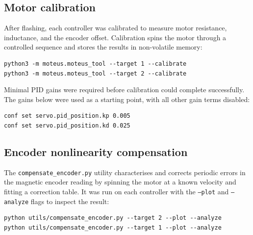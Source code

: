 \subsection{Motor calibration}

After flashing, each controller was calibrated to measure motor resistance, inductance,
and the encoder offset.
Calibration spins the motor through a controlled sequence and stores the results in
non-volatile memory:

\begin{listing}[H]
	\begin{verbatim}
python3 -m moteus.moteus_tool --target 1 --calibrate
python3 -m moteus.moteus_tool --target 2 --calibrate
\end{verbatim}
	\caption{Running the built-in calibration routine on both controllers.}
	\label{lst:moteus-calibrate}
\end{listing}

\noindent
Minimal PID gains were required before calibration could complete successfully.
The gains below were used as a starting point, with all other gain terms disabled:

\begin{listing}[H]
	\begin{verbatim}
conf set servo.pid_position.kp 0.005
conf set servo.pid_position.kd 0.025
\end{verbatim}
	\caption{Minimal PID gains set in tview prior to calibration.}
	\label{lst:moteus-init-pid}
\end{listing}

\subsection{Encoder nonlinearity compensation}

The \texttt{compensate\_encoder.py} utility characterises and corrects periodic errors in the
magnetic encoder reading by spinning the motor at a known velocity and fitting a correction
table.
It was run on each controller with the \texttt{--plot} and \texttt{--analyze} flags to
inspect the result:

\begin{listing}[H]
	\begin{verbatim}
python utils/compensate_encoder.py --target 2 --plot --analyze
python utils/compensate_encoder.py --target 1 --plot --analyze
\end{verbatim}
	\caption{Encoder nonlinearity compensation for horn (ID~2) and drum (ID~1).}
	\label{lst:moteus-enc-comp}
\end{listing}

